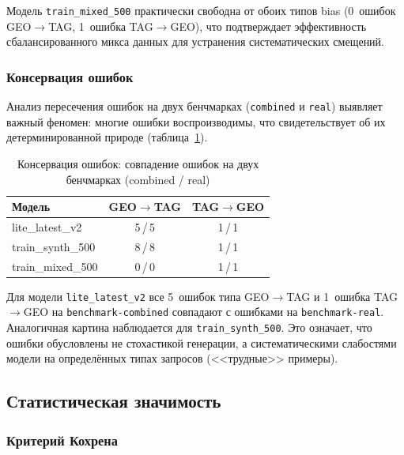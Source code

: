 Модель \texttt{train\_mixed\_500} практически свободна от обоих типов bias (0~ошибок GEO$\to$TAG, 1~ошибка TAG$\to$GEO), что подтверждает эффективность сбалансированного микса данных для устранения систематических смещений.

\subsubsection{Консервация ошибок}

Анализ пересечения ошибок на двух бенчмарках (\texttt{combined} и \texttt{real}) выявляет важный феномен: многие ошибки воспроизводимы, что свидетельствует об их детерминированной природе (таблица~\ref{tab:error_conservation}).

\begin{table}[H]
\centering
\caption{Консервация ошибок: совпадение ошибок на двух бенчмарках (combined / real)}
\label{tab:error_conservation}
\def\arraystretch{1.15}
\begin{tabular}{l c c}
    \toprule
    \textbf{Модель} & \textbf{GEO$\to$TAG} & \textbf{TAG$\to$GEO} \\
    \midrule
    lite\_latest\_v2   & 5\,/\,5 & 1\,/\,1 \\
    train\_synth\_500  & 8\,/\,8 & 1\,/\,1 \\
    train\_mixed\_500  & 0\,/\,0 & 1\,/\,1 \\
    \bottomrule
\end{tabular}
\end{table}

Для модели \texttt{lite\_latest\_v2} все 5~ошибок типа GEO$\to$TAG и 1~ошибка TAG$\to$GEO на \texttt{benchmark-combined} совпадают с ошибками на \texttt{benchmark-real}. Аналогичная картина наблюдается для \texttt{train\_synth\_500}. Это означает, что ошибки обусловлены не стохастикой генерации, а систематическими слабостями модели на определённых типах запросов (<<трудные>> примеры).

\subsection{Статистическая значимость} \label{subsec:significance}

\subsubsection{Критерий Кохрена}


